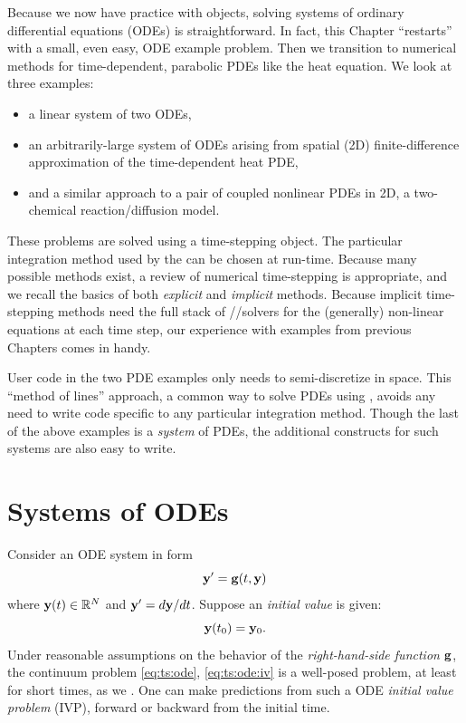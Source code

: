 
Because we now have practice with \PETSc objects, solving systems of ordinary differential equations (ODEs) is straightforward.  In fact, this Chapter ``restarts'' with a small, even easy, ODE example problem.  Then we transition to numerical methods for time-dependent, parabolic PDEs like the heat equation.  We look at three examples:
\begin{itemize}
\item a linear system of two ODEs,
\item an arbitrarily-large system of ODEs arising from spatial (2D) finite-difference approximation of the time-dependent heat PDE,
\item and a similar approach to a pair of coupled nonlinear PDEs in 2D, a two-chemical reaction/diffusion model.
\end{itemize}

These problems are solved using a \PETSc \pTS time-stepping object.  The particular integration method used by the \pTS can be chosen at run-time.  Because many possible methods exist, a review of numerical time-stepping is appropriate, and we recall the basics of both \emph{explicit} and \emph{implicit} methods.  Because implicit time-stepping methods need the full stack of \pSNES/\pKSP/\pPC solvers for the (generally) non-linear equations at each time step, our experience with \pSNES examples from previous Chapters comes in handy.

User code in the two PDE examples only needs to semi-discretize in space.  This ``method of lines'' approach, a common way to solve PDEs using \pTS, avoids any need to write code specific to any particular integration method.  Though the last of the above examples is a \emph{system} of PDEs, the additional \PETSc constructs for such systems are also easy to write.


\section{Systems of ODEs}

Consider an ODE system in form
\begin{equation}
\mathbf{y}' = \mathbf{g}(t,\mathbf{y})  \label{eq:ts:ode}
\end{equation}
where $\mathbf{y}(t) \in \mathbb{R}^N$ and $\mathbf{y}'=d\mathbf{y}/dt$.  Suppose an \emph{initial value} is given:
\begin{equation}
\mathbf{y}(t_0) = \mathbf{y}_0.  \label{eq:ts:ode:iv}
\end{equation}
Under reasonable assumptions on the behavior of the \emph{right-hand-side function} $\mathbf{g}$, the continuum problem \eqref{eq:ts:ode}, \eqref{eq:ts:ode:iv} is a well-posed problem, at least for short times, as we .  One can make predictions from such a ODE \emph{initial value problem} (IVP), forward or backward from the initial time.

